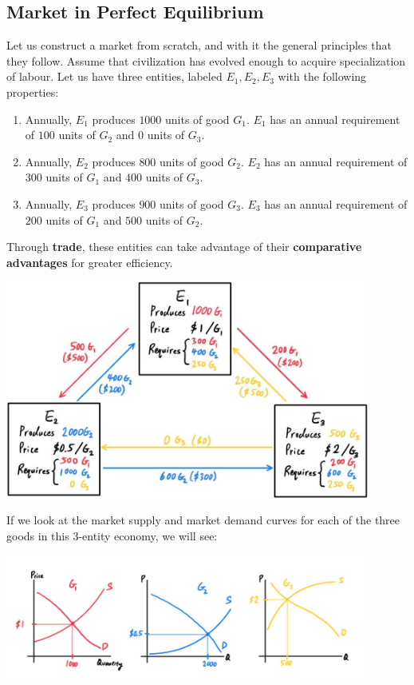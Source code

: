 \documentclass{article}
\begin{document}
  \subsection{Market in Perfect Equilibrium}

    Let us construct a market from scratch, and with it the general principles that they follow. Assume that civilization has evolved enough to acquire specialization of labour. Let us have three entities, labeled $E_1, E_2, E_3$ with the following properties:
    \begin{enumerate}
      \item Annually, $E_1$ produces $1000$ units of good $G_1$. $E_1$ has an annual requirement of $100$ units of $G_2$ and $0$ units of $G_3$.
      \item Annually, $E_2$ produces $800$ units of good $G_2$. $E_2$ has an annual requirement of $300$ units of $G_1$ and $400$ units of $G_3$.
      \item Annually, $E_3$ produces $900$ units of good $G_3$. $E_3$ has an annual requirement of $200$ units of $G_1$ and $500$ units of $G_2$.
    \end{enumerate}
    Through \textbf{trade}, these entities can take advantage of their \textbf{comparative advantages} for greater efficiency.
    \begin{center}
      \includegraphics[width=0.9\textwidth]{img/Initial_Trade.jpg}
    \end{center}
    If we look at the market supply and market demand curves for each of the three goods in this 3-entity economy, we will see:
    \begin{center}
      \includegraphics[width=0.9\textwidth]{img/Supply_Demand_Curves_of_3_Goods.jpg}
    \end{center}
\end{document}
